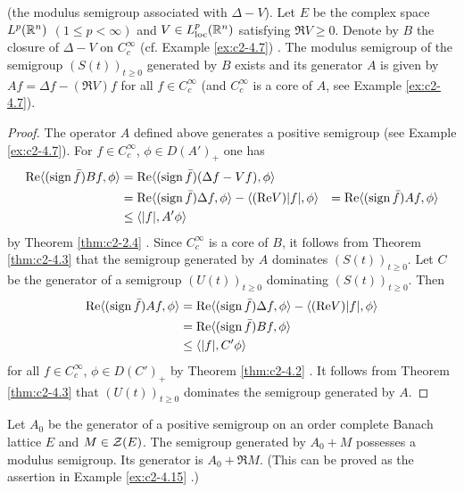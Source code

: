 \begin{example}\label{ex:c2-4.15}
(the modulus semigroup associated with $\Delta - V$).
Let $E$ be the complex space $L^{p}(\mathbb{R}^{n})$ $(1 \leq p < \infty)$ and $V \in L^{p}_{\text{loc}}(\mathbb{R}^{n})$ satisfying $\Re V \geq 0$.
Denote by $B$ the closure of $\Delta - V$ on $C^{\infty}_{c}$
(cf. Example \ref{ex:c2-4.7}) .
The modulus semigroup of the semigroup $(S(t))_{t \geq 0}$ generated by $B$ exists and its generator $A$ is given by $Af = \Delta f - (\Re V)f$ for all $f \in C^{\infty}_{c}$ (and $C^{\infty}_{c}$ is a core of $A$, see Example \ref{ex:c2-4.7}).
\end{example}

\begin{proof}
The operator $A$ defined above generates a positive semigroup (see Example \ref{ex:c2-4.7}).
For $f \in C^{\infty}_{c}$, $\phi \in D(A')_{+}$ one has
\begin{align*}
\mathop{}\!\mathrm{Re}\langle(\operatorname{sign}  \bar{f})Bf,\phi\rangle &= \mathop{}\!\mathrm{Re}\langle(\operatorname{sign}  \bar{f})(\Delta f - Vf),\phi\rangle \\
&=\mathop{}\!\mathrm{Re}\langle(\operatorname{sign}  \bar{f})\Delta f,\phi\rangle - \langle(\mathop{}\!\mathrm{Re} V)|f|,\phi\rangle &= \mathop{}\!\mathrm{Re}\langle(\operatorname{sign}  \bar{f})Af,\phi\rangle \\
&\leq \langle|f|,A'\phi\rangle 
\end{align*}
by Theorem \ref{thm:c2-2.4}  .
Since $C^{\infty}_{c}$ is a core of $B$, it follows from Theorem \ref{thm:c2-4.3}   that the semigroup generated by $A$ dominates $(S(t))_{t \geq 0}$.
Let $C$ be the generator of a semigroup $(U(t))_{t \geq 0}$ dominating $(S(t))_{t \geq 0}$.
Then
\begin{align*}
\mathop{}\!\mathrm{Re}\langle(\operatorname{sign}  \bar{f})Af,\phi\rangle &= \mathop{}\!\mathrm{Re}\langle(\operatorname{sign}  \bar{f})\Delta f,\phi\rangle - \langle(\mathop{}\!\mathrm{Re} V)|f|,\phi\rangle \\
&= \mathop{}\!\mathrm{Re}\langle(\operatorname{sign}  \bar{f})Bf,\phi\rangle\\
&\leq \langle|f|,C'\phi\rangle 
\end{align*}
for all  $f \in C^{\infty}_{c}$, $\phi \in D(C')_{+}$  by Theorem \ref{thm:c2-4.2}  . 
It follows from Theorem \ref{thm:c2-4.3}   that $(U(t))_{t \geq 0}$ dominates the semigroup generated by $A$.
\end{proof}
\begin{example}\label{ex:c2-4.16}
Let $A_{0}$ be the generator of a positive semigroup on an order complete Banach lattice $E$ and $M \in \mathcal{Z}(E)$.
The semigroup generated by $A_{0} + M$ possesses a modulus semigroup. Its generator is $A_{0} + \Re M$. (This can be proved as the assertion in Example \ref{ex:c2-4.15}  .)
\end{example}

